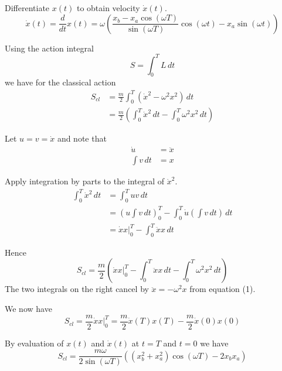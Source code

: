 \documentclass[12pt]{article}
\begin{document}
Differentiate $x(t)$ to obtain velocity $\dot x(t)$.
\begin{equation*}
\dot x(t)=\frac{d}{dt}x(t)=
\omega\left(
\frac{x_b-x_a\cos(\omega T)}{\sin(\omega T)}\cos(\omega t)-x_a\sin(\omega t)
\right)
\tag{3}
\end{equation*}

Using the action integral
\begin{equation*}
S=\int_0^T L\,dt
\end{equation*}
we have for the classical action
\begin{align*}
S_{cl}&=\frac{m}{2}\int_0^T (\dot{x}^2-\omega^2 x^2)\,dt
\\[1ex]
&=\frac{m}{2}\left(
\int_0^T\dot{x}^2\,dt
-\int_0^T\omega^2x^2\,dt\right)
\end{align*}

Let $u=v=\dot x$ and note that
\begin{align*}
\dot u&=\ddot x
\\[1ex]
\int v\,dt&=x
\end{align*}

Apply integration by parts to the integral of $\dot x^2$.
\begin{align*}
\int_0^T \dot x^2\,dt
&=\int_0^T uv\,dt
\\[1ex]
&=\left(u\int v\,dt\right)_0^T
-\int_0^T\dot u\left(\int v\,dt\right)\,dt
\\[1ex]
&=\dot xx\bigg|_0^T-\int_0^T \ddot xx\,dt
\end{align*}

Hence
\begin{equation*}
S_{cl}=\frac{m}{2}\left(
\dot xx\bigg|_0^T-\int_0^T \ddot xx\,dt
-\int_0^T\omega^2x^2\,dt
\right)
\end{equation*}
The two integrals on the right cancel by $\ddot x=-\omega^2x$ from equation (1).

\bigskip
We now have
\begin{equation*}
S_{cl}=\frac{m}{2}\dot xx\bigg|_0^T
=\frac{m}{2}\dot x(T)x(T)-\frac{m}{2}\dot x(0)x(0)
\tag{4}
\end{equation*}

By evaluation of $x(t)$ and $\dot x(t)$ at $t=T$ and $t=0$ we have
\begin{equation*}
S_{cl}=\frac{m\omega}{2\sin(\omega T)}
\left(\left(x_b^2+x_a^2\right)\cos(\omega T)-2x_b x_a\right)
\tag{5}
\end{equation*}
\end{document}
